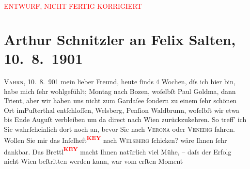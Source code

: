 
\begin{center}
            \textcolor{red}{ENTWURF, NICHT FERTIG KORRIGIERT}
                      \end{center}
            
         
         \newcommand{\erwaehntePersonen}{Personen: Anton Bettelheim, Eduard Devrient, Paul Goldmann, Felix Salten}
         \newcommand{\erwaehnteInstitutionen}{}
         \newcommand{\erwaehnteOrte}{Orte: Bozen, Lago di Garda, Pustertal, Trient, Vahrn, Venedig, Verona, Welsberg-Taisten, Wien, Wildbad Waldbrunn}
         \newcommand{\erwaehnteWerke}{Werke: Allgemeine Zeitung, Literatur, Zum Säkulartag Eduard Devrients}
               \section[Arthur Schnitzler an Felix Salten, 10. 8. 1901]{ Arthur Schnitzler an Felix Salten, 10. 8. 1901}\nopagebreak{}\rehead{ }\begin{ledgroupsized}[t]{13cm}\normalsize\beginnumbering \toendnotes[C]{\smallbreak\pagebreak[2]} 
\toendnotes[C]{\smallbreak}\pstart
           \raggedleft{}{\pb}\textsc{Vahrn}, 10. 8. 901\pend
           \pstart
           mein lieber Freund, heute ſinds 4 Wochen, dſs ich hier bin, habe mich ſehr wohlgefühlt;
                  Montag nach Bozen, woſelbſt Paul Goldma{\geminationn}, dann
               Trient, aber wir haben uns nicht zum Gardaſee ſondern zu einem ſehr schönen Ort imPuſterthal entſchloſſen, Welsberg, Penſion {\pb}Waldbrunn, woſelbſt wir
               etwa bis Ende Auguſt verbleiben um da{\geminationn}
               direct nach Wien zurückzukehren. So treff’ ich Sie
               wahrſcheinlich dort noch an, bevor Sie nach \textsc{Verona} oder \textsc{Venedig} fahren. Wollen Sie mir das Inſelheft\textcolor{red}{\textsuperscript{\textbf{KEY}}} nach \textsc{Welsberg} ſchicken? wäre Ihnen ſehr dankbar. Das Brettl\textcolor{red}{\textsuperscript{\textbf{KEY}}} macht Ihnen natürlich viel Mühe, {\pb}– daſs der Erfolg nicht Wien beſtritten werden kann, war vom erſten Moment

\end{ledgroupsized}
